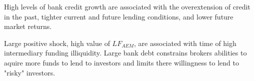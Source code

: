 High levels of bank credit growth are associated with the overextension of credit in the past, tighter current and future lending conditions, and lower future market returns.

Large positive shock, high value of $LF_{AEM}$, are associated with time of high intermediary funding illiquidity. Large bank debt constrains brokers abilities to aquire more funds to lend to investors and limits there willingness to lend to "risky" investors.